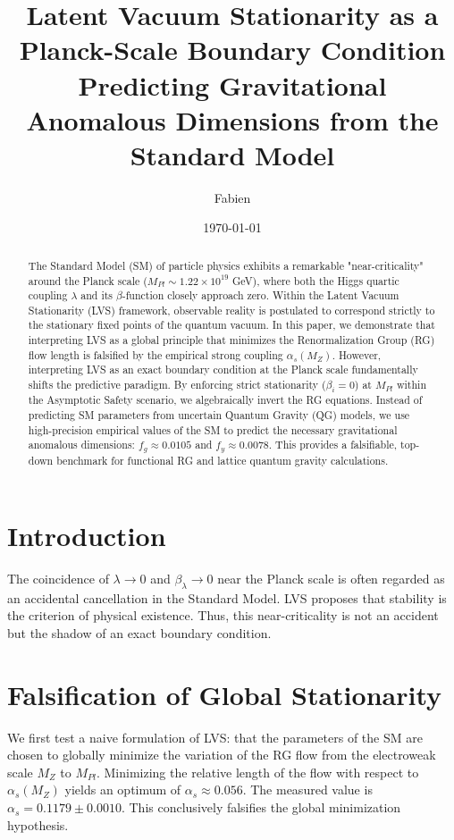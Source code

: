 \documentclass[11pt,a4paper]{article}
\title{\textbf{Latent Vacuum Stationarity as a Planck-Scale Boundary Condition}\\
\large Predicting Gravitational Anomalous Dimensions from the Standard Model}
\author{Fabien}
\date{\today}
\begin{document}
\maketitle

\begin{abstract}
The Standard Model (SM) of particle physics exhibits a remarkable "near-criticality" around the Planck scale ($M_{Pl} \sim 1.22 \times 10^{19}$ GeV), where both the Higgs quartic coupling $\lambda$ and its $\beta$-function closely approach zero. Within the Latent Vacuum Stationarity (LVS) framework, observable reality is postulated to correspond strictly to the stationary fixed points of the quantum vacuum. In this paper, we demonstrate that interpreting LVS as a global principle that minimizes the Renormalization Group (RG) flow length is falsified by the empirical strong coupling $\alpha_s(M_Z)$. However, interpreting LVS as an exact boundary condition at the Planck scale fundamentally shifts the predictive paradigm. By enforcing strict stationarity ($\beta_i = 0$) at $M_{Pl}$ within the Asymptotic Safety scenario, we algebraically invert the RG equations. Instead of predicting SM parameters from uncertain Quantum Gravity (QG) models, we use high-precision empirical values of the SM to predict the necessary gravitational anomalous dimensions: $f_g \approx 0.0105$ and $f_y \approx 0.0078$. This provides a falsifiable, top-down benchmark for functional RG and lattice quantum gravity calculations.
\end{abstract}

\section{Introduction}
The coincidence of $\lambda \to 0$ and $\beta_\lambda \to 0$ near the Planck scale is often regarded as an accidental cancellation in the Standard Model. LVS proposes that stability is the criterion of physical existence. Thus, this near-criticality is not an accident but the shadow of an exact boundary condition.

\section{Falsification of Global Stationarity}
We first test a naive formulation of LVS: that the parameters of the SM are chosen to globally minimize the variation of the RG flow from the electroweak scale $M_Z$ to $M_{Pl}$. Minimizing the relative length of the flow with respect to $\alpha_s(M_Z)$ yields an optimum of $\alpha_s \approx 0.056$. The measured value is $\alpha_s = 0.1179 \pm 0.0010$. This conclusively falsifies the global minimization hypothesis.
\end{document}
